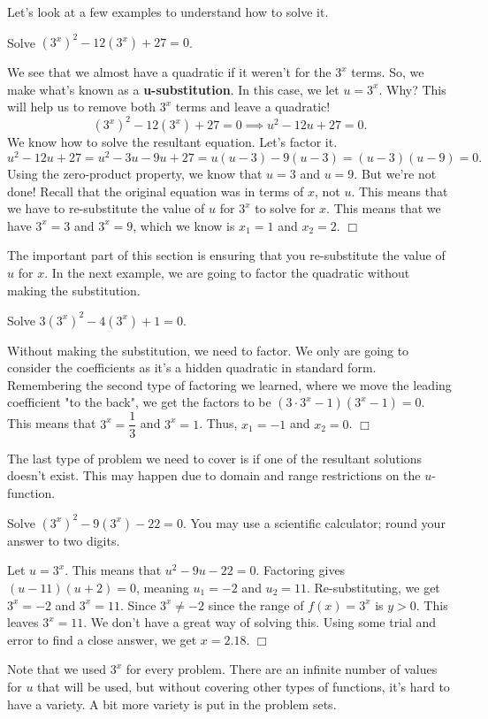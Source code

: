 \documentclass[../book.tex]{subfiles}
\begin{document}
Let's look at a few examples to understand how to solve it.  
\begin{example}
Solve $\left(3^x\right)^2-12\left(3^x\right)+27=0$.
\end{example}
\begin{solution}
We see that we almost have a quadratic if it weren't for the $3^x$ terms.  So, we make what's known as a \textbf{u-substitution}.  In this case, we let $u=3^x$.  Why?  This will help us to remove both $3^x$ terms and leave a quadratic!
$$\left(3^x\right)^2-12\left(3^x\right)+27=0 \implies u^2-12u+27=0.$$  We know how to solve the resultant equation.  Let's factor it.  $$u^2-12u+27=u^2-3u-9u+27=u(u-3)-9(u-3)=(u-3)(u-9)=0.$$
Using the zero-product property, we know that $u=3$ and $u=9$.  But we're not done!  Recall that the original equation was in terms of $x$, not $u$.  This means that we have to re-substitute the value of $u$ for $3^x$ to solve for $x$.  This means that we have $3^x=3$ and $3^x=9$, which we know is $x_1=1$ and $x_2=2$.  $\Box$
\end{solution}
The important part of this section is ensuring that you re-substitute the value of $u$ for $x$.  In the next example, we are going to factor the quadratic without making the substitution.
\begin{example}
Solve $3\left(3^x\right)^2-4\left(3^x\right)+1=0$.
\end{example}
\begin{solution}
Without making the substitution, we need to factor.  We only are going to consider the coefficients as it's a hidden quadratic in standard form.  Remembering the second type of factoring we learned, where we move the leading coefficient "to the back", we get the factors to be $\left(3\cdot 3^x-1\right)\left(3^x-1\right)=0.$  This means that $3^x=\dfrac{1}{3}$ and $3^x=1$.  Thus, $x_1=-1$ and $x_2=0$.  $\Box$
\end{solution}
The last type of problem we need to cover is if one of the resultant solutions doesn't exist.  This may happen due to domain and range restrictions on the $u$-function.
\begin{example}
Solve $\left(3^x\right)^2-9\left(3^x\right)-22=0$.  You may use a scientific calculator; round your answer to two digits.
\end{example}
\begin{solution}
Let $u=3^x$.  This means that $u^2-9u-22=0$.  Factoring gives $(u-11)(u+2)=0$, meaning $u_1=-2$ and $u_2=11$.  Re-substituting, we get $3^x=-2$ and $3^x=11$.  Since $3^x\neq -2$ since the range of $f(x)=3^x$ is $y>0$.  This leaves $3^x=11$.  We don't have a great way of solving this.  Using some trial and error to find a close answer, we get $x=2.18$.  $\Box$
\end{solution}
Note that we used $3^x$ for every problem.  There are an infinite number of values for $u$ that will be used, but without covering other types of functions, it's hard to have a variety.  A bit more variety is put in the problem sets.
\end{document}
